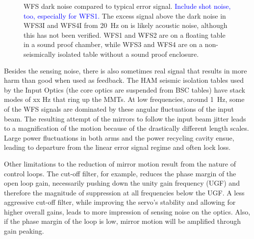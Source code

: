 \begin{figure}
\begin{centering}
\caption[WFS error signal and dark noise]{WFS dark noise compared to typical error signal. \textcolor{blue}{Include shot noise, too, especially for WFS1.} The excess signal above the dark noise in WFS3I and WFS4I from 20~Hz on is likely acoustic noise, although this has not been verified. WFS1 and WFS2 are on a floating table in a sound proof chamber, while WFS3 and WFS4 are on a non-seismically isolated table without a sound proof enclosure.}
\label{fig:WFSdarknoise}
\end{centering}
\end{figure}

Besides the sensing noise, there is also sometimes real signal that results in more harm than good when used as feedback. The HAM seismic isolation tables used by the Input Optics (the core optics are suspended from BSC tables) have stack modes of xx Hz that ring up the MMTs.  At low frequencies, around 1~Hz, some of the WFS signals are dominated by these angular fluctuations of the input beam. The resulting attempt of the mirrors to follow the input beam jitter leads to a magnification of the motion because of the drastically different length scales. Large power fluctuations in both arms and the power recycling cavity ensue, leading to departure from the linear error signal regime and often lock loss. 

Other limitations to the reduction of mirror motion result from the nature of control loops. The cut-off filter, for example, reduces the phase margin of the open loop gain, necessarily pushing down the unity gain frequency (UGF) and therefore the magnitude of suppression at all frequencies below the UGF. A less aggressive cut-off filter, while improving the servo's stability and allowing for higher overall gains, leads to more impression of sensing noise on the optics. Also, if the phase margin of the loop is low, mirror motion will be amplified through gain peaking.





